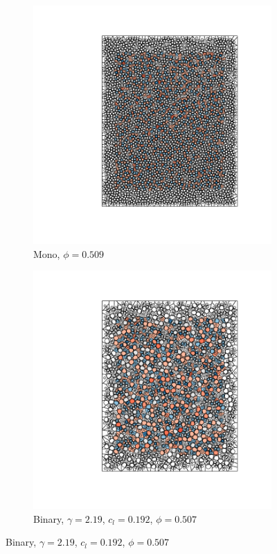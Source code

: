 \begin{figure}[bt]
     \centering
     
      \begin{subfigure}[b]{0.48\textwidth}
         \centering
         \includegraphics[width=\textwidth]{./figures/quasi2d/exp_mono.pdf}
         \caption{Mono, $\phi=0.509$}
         \label{fig:expvoro1}
     \end{subfigure}
     \hfill
       \begin{subfigure}[b]{0.48\textwidth}
         \centering
         \includegraphics[width=\textwidth]{./figures/quasi2d/exp_lsr.pdf}
         \caption{Binary, $\gamma=2.19$, $c_l=0.192$, $\phi=0.507$}
         \label{fig:expvoro2}
     \end{subfigure}
     \hfill
     

\end{figure}
